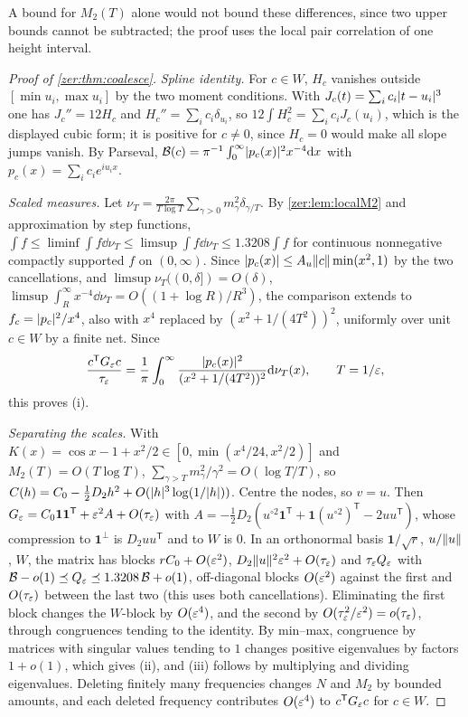 A bound for $M_2(T)$ alone would not bound these differences, since two upper bounds cannot be
subtracted; the proof uses the local pair correlation of one height interval.

\begin{proof}[Proof of \cref{zer:thm:coalesce}]
\emph{Spline identity.} For $c\in W$, $H_c$ vanishes outside $[\min u_i,\max u_i]$ by the two
moment conditions. With $J_c(t)=\sum_ic_i\lvert t-u_i\rvert^3$ one has $J_c''=12H_c$ and
$H_c''=\sum_ic_i\delta_{u_i}$, so $12\int H_c^2=\sum_ic_iJ_c(u_i)$, which is the displayed cubic form;
it is positive for $c\ne0$, since $H_c=0$ would make all slope jumps vanish. By Parseval,
$\mathcal B(c)=\pi^{-1}\int_0^\infty\lvert p_c(x)\rvert^2x^{-4}\mathrm{d} x$ with $p_c(x)=\sum_ic_ie^{iu_ix}$.

\emph{Scaled measures.} Let $\nu_T=\frac{2\pi}{T\log T}\sum_{\gamma>0}m_\gamma^2\delta_{\gamma/T}$. By
\cref{zer:lem:localM2} and approximation by step functions,
$\int f\le\liminf\int f\dd\nu_T\le\limsup\int f\dd\nu_T\le1.3208\int f$ for continuous nonnegative
compactly supported $f$ on $(0,\infty)$. Since $\lvert p_c(x)\rvert\le A_u\lVert c\rVert\min(x^2,1)$ by the two
cancellations, and $\limsup\nu_T((0,\delta])=O(\delta)$,
$\limsup\int_R^\infty x^{-4}\dd\nu_T=O((1+\log R)/R^3)$, the comparison extends to
$f_c=\lvert p_c\rvert^2/x^4$, also with $x^4$ replaced by $(x^2+1/(4T^2))^2$, uniformly over unit $c\in W$
by a finite net. Since
\[
 \frac{c^{\mathsf T}G_\varepsilon c}{\tau_\varepsilon}=\frac1\pi\int_0^\infty\frac{\lvert p_c(x)\rvert^2}{(x^2+1/(4T^2))^2}\mathrm{d}\nu_T(x),\qquad T=1/\varepsilon,
\]
this proves (i).

\emph{Separating the scales.} With $K(x)=\cos x-1+x^2/2\in[0,\min(x^4/24,x^2/2)]$ and
$M_2(T)=O(T\log T)$, $\sum_{\gamma>T}m_\gamma^2/\gamma^2=O(\log T/T)$, so
$C(h)=C_0-\tfrac12D_2h^2+O(\lvert h\rvert^3\log(1/\lvert h\rvert))$. Centre the nodes, so $v=u$. Then
$G_\varepsilon=C_0\mathbf 1\mathbf 1^{\mathsf T}+\varepsilon^2A+O(\tau_\varepsilon)$ with
$A=-\tfrac12D_2(u^{\circ2}\mathbf 1^{\mathsf T}+\mathbf 1(u^{\circ2})^{\mathsf T}-2uu^{\mathsf T})$, whose
compression to $\mathbf 1^\perp$ is $D_2uu^{\mathsf T}$ and to $W$ is $0$. In an orthonormal basis
$\mathbf 1/\sqrt r$, $u/\lVert u\rVert$, $W$, the matrix has blocks $rC_0+O(\varepsilon^2)$,
$D_2\lVert u\rVert^2\varepsilon^2+O(\tau_\varepsilon)$ and $\tau_\varepsilon Q_\varepsilon$ with $\mathcal B-o(1)\preceq Q_\varepsilon\preceq1.3208\,\mathcal B+o(1)$,
off-diagonal blocks $O(\varepsilon^2)$ against the first and $O(\tau_\varepsilon)$ between the last two (this
uses both cancellations). Eliminating the first block changes the $W$-block by $O(\varepsilon^4)$, and the
second by $O(\tau_\varepsilon^2/\varepsilon^2)=o(\tau_\varepsilon)$, through congruences tending to the identity. By
min--max, congruence by matrices with singular values tending to $1$ changes positive
eigenvalues by factors $1+o(1)$, which gives (ii), and (iii) follows by multiplying and dividing
eigenvalues. Deleting finitely many frequencies changes $N$ and $M_2$ by bounded amounts, and
each deleted frequency contributes $O(\varepsilon^4)$ to $c^{\mathsf T}G_\varepsilon c$ for $c\in W$.
\end{proof}

